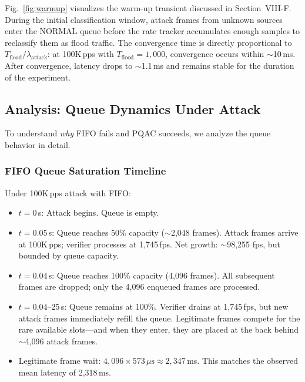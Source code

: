 \documentclass[journal]{IEEEtran}
\begin{document}
Fig.~\ref{fig:warmup} visualizes the warm-up transient discussed in Section~VIII-F. During the initial classification window, attack frames from unknown sources enter the NORMAL queue before the rate tracker accumulates enough samples to reclassify them as flood traffic. The convergence time is directly proportional to $T_{\text{flood}} / \lambda_{\text{attack}}$: at 100K\,pps with $T_{\text{flood}} = 1{,}000$, convergence occurs within $\sim$10\,ms. After convergence, latency drops to $\sim$1.1\,ms and remains stable for the duration of the experiment.

\subsection{Analysis: Queue Dynamics Under Attack}
To understand \emph{why} FIFO fails and PQAC succeeds, we analyze the queue behavior in detail.

\subsubsection{FIFO Queue Saturation Timeline}
Under 100K\,pps attack with FIFO:
\begin{itemize}[leftmargin=*]
    \item $t = 0$\,s: Attack begins. Queue is empty.
    \item $t = 0.05$\,s: Queue reaches 50\% capacity ($\sim$2,048 frames). Attack frames arrive at 100K\,pps; verifier processes at 1,745\,fps. Net growth: $\sim$98,255 fps, but bounded by queue capacity.
    \item $t = 0.04$\,s: Queue reaches 100\% capacity (4,096 frames). All subsequent frames are dropped; only the 4,096 enqueued frames are processed.
    \item $t = 0.04$--25\,s: Queue remains at 100\%. Verifier drains at 1,745\,fps, but new attack frames immediately refill the queue. Legitimate frames compete for the rare available slots---and when they enter, they are placed at the back behind $\sim$4,096 attack frames.
    \item Legitimate frame wait: $4{,}096 \times 573\,\mu\text{s} \approx 2{,}347$\,ms. This matches the observed mean latency of 2,318\,ms.
\end{itemize}
\end{document}
